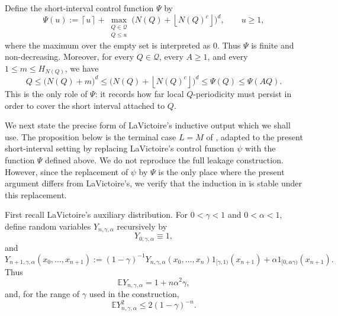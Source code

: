 \documentclass[12pt,leqno]{amsart}
\numberwithin{equation}{section}
\numberwithin{counter2}{section}
\theoremstyle{definition}
\theoremstyle{plain}
\newcommand{\floor}[1]{\left\lfloor #1 \right\rfloor}
\newcommand{\ceiling}[1]{\left\lceil #1 \right\rceil}
\begin{document}
Define the short-interval control function \(\Psi\) by
\[
\Psi(u)
:=
\ceiling{u}
+
\max_{\substack{Q\in\mathcal Q\\ Q\leq u}}
\bigl(N(Q)+ \floor{N(Q)^c} \bigr)^d,
\qquad u\geq 1,
\]
where the maximum over the empty set is interpreted as \(0\). Thus \(\Psi\) is
finite and non-decreasing. Moreover, for every \(Q\in\mathcal Q\), every
\(A\geq1\), and every \(1\leq m\leq H_{N(Q)}\), we have
\[
Q
\leq
\bigl(N(Q)+m\bigr)^d
\leq
\bigl(N(Q)+\floor{N(Q)^c}\bigr)^d
\leq
\Psi(Q)
\leq
\Psi(AQ).
\]
This is the only role of \(\Psi\): it records how far local \(Q\)-periodicity
must persist in order to cover the short interval attached to \(Q\).

We next state the precise form of LaVictoire's inductive output which we shall
use. The proposition below is the terminal case \(L=M\) of
\cite[Proposition~4.1]{L9}, adapted to the present short-interval setting by
replacing LaVictoire's control function \(\psi\) with the function \(\Psi\)
defined above. We do not reproduce the full leakage construction. However, since
the replacement of \(\psi\) by \(\Psi\) is the only place where the present
argument differs from LaVictoire's, we verify that the
induction in \cite[Sections~4--8]{L9} is stable under this replacement.

First recall LaVictoire's auxiliary distribution. For \(0<\gamma<1\) and
\(0<\alpha<1\), define random variables \(Y_{n,\gamma,\alpha}\) recursively by
\[
Y_{0,\gamma,\alpha}\equiv 1,
\]
and
\[
Y_{n+1,\gamma,\alpha}(x_0,\dots,x_{n+1})
:=
(1-\gamma)^{-1}
Y_{n,\gamma,\alpha}(x_0,\dots,x_n)
1_{[\gamma,1)}(x_{n+1})
+
\alpha 1_{[0,\alpha\gamma)}(x_{n+1}).
\]
Thus
\[
\mathbb E Y_{n,\gamma,\alpha}
=
1+n\alpha^2\gamma,
\]
and, for the range of \(\gamma\) used in the construction,
\[
\mathbb E Y_{n,\gamma,\alpha}^2
\leq
2(1-\gamma)^{-n}.
\]
\end{document}
